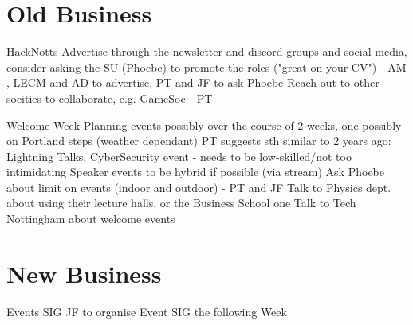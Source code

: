 \documentclass[11pt,hacksoc]{meetingmins}
\begin{document}
\section{Old Business}
\begin{items}
\item{HackNotts}
	\subitem Advertise through the newsletter and discord groups and social media, consider asking the SU (Phoebe) to promote the roles ("great on your CV") - AM , LECM and AD to advertise, PT and JF to ask Phoebe
    \subitem Reach out to other socities to collaborate, e.g. GameSoc - PT 
\item{Welcome Week Planning}
	 events possibly over the course of 2 weeks, one possibly on Portland steps (weather dependant)
	\subitem PT suggests sth similar to 2 years ago: Lightning Talks, CyberSecurity event - needs to be low-skilled/not too intimidating 
    \subitem Speaker events to be hybrid if possible (via stream)
    \subitem Ask Phoebe about limit on events (indoor and outdoor) - PT and JF
    \subitem Talk to Physics dept. about using their lecture halls, or the Business School one 
    \subitem Talk to Tech Nottingham about welcome events
\end{items}

\section{New Business}
\begin{items}
\item {Events SIG}
	\subitem JF to organise Event SIG the following Week
\end{items}

\vspace{1em}

\end{document}

